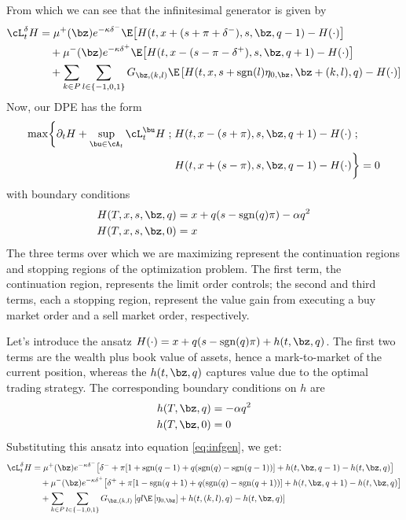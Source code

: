 \documentclass[12pt]{article}
\begin{document}
From which we can see that the infinitesimal generator is given by
\begin{equation}
\label{eq:infgen}
\begin{split}
\cL^{\delta}_t H & = \mu^+(\bz) e^{ -\kappa \delta^{-}} \E \bigl[ H(t,x+(s+\pi+\delta^-),s,\bz,q-1) - H(\cdot) \bigr] \\
& \quad + \mu^-(\bz) e^{ -\kappa \delta^{+}} \E \bigl[ H(t,x-(s-\pi-\delta^+),s,\bz,q+1) - H(\cdot) \bigr] \\
& \quad + \sum_{k\in P} \sum_{l \in \{-1,0,1\}} G_{\bz,(k,l)} \E \left[ H(t,x,s+\mathrm{sgn}(l)\eta_{0,\bz},\bz+(k,l),q) - H(\cdot) \right] 
\end{split}
\end{equation}
Now, our DPE has the form
\begin{equation}
\label{eq:DPEmaxprofit}
\begin{split}
\max \biggl\lbrace \partial_t H + \sup \limits_{\bu \in \cA_t} \cL^{\bu}_t H \; ; \; & H(t,x-(s+\pi), s, \bz, q+1) - H(\cdot) \; ; \\
&  H(t,x+(s-\pi), s, \bz, q-1) - H(\cdot) \biggr\rbrace = 0
\end{split}
\end{equation}
with boundary conditions
\begin{align}
H(T, x, s, \bz, q) & = x + q(s - \mathrm{sgn}(q)\pi) - \alpha q^2 \\
H(T, x, s, \bz, 0) & = x
\end{align}
The three terms over which we are maximizing represent the continuation regions and stopping regions of the optimization problem. The first term, the continuation region, represents the limit order controls; the second and third terms, each a stopping region, represent the value gain from executing a buy market order and a sell market order, respectively.

Let's introduce the ansatz $H(\cdot) = x + q(s - \mathrm{sgn}(q)\pi) + h(t,\bz,q)$. The first two terms are the wealth plus book value of assets, hence a mark-to-market of the current position, whereas the $h(t,\bz,q)$ captures value due to the optimal trading strategy. The corresponding boundary conditions on $h$ are
\begin{align}
h(T, \bz, q) & = - \alpha q^2 \\
h(T, \bz, 0) & = 0
\end{align}
Substituting this ansatz into equation \ref{eq:infgen}, we get:
\begin{align*}
\cL^{\delta}_t H & = \mu^+(\bz) e^{ -\kappa \delta^{-}} \bigl[ \delta^- + \pi [ 1 + \mathrm{sgn}(q-1) + q(\mathrm{sgn}(q) - \mathrm{sgn}(q-1) ) ] + h(t,\bz,q-1) - h(t,\bz,q) \bigr] \\
& \quad + \mu^-(\bz) e^{ -\kappa \delta^{+}} \bigl[ \delta^+ + \pi [ 1 - \mathrm{sgn}(q+1) + q(\mathrm{sgn}(q) - \mathrm{sgn}(q+1) ) ] + h(t,\bz,q+1) - h(t,\bz,q) \bigr] \\
& \quad + \sum_{k\in P} \sum_{l \in \{-1,0,1\}} G_{\bz,(k,l)} \left[ ql \E \left[ \eta_{0,\bz} \right] + h(t,(k,l),q) - h(t,\bz,q) \right] 
\end{align*}
\end{document}

